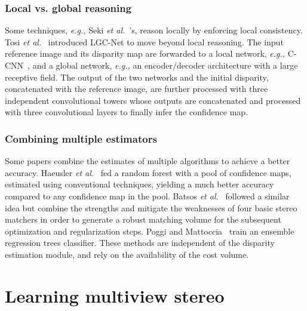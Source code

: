 \documentclass[10pt,journal,compsoc]{IEEEtran}
\newcommand{\eg}{\emph{e.g., }}
\newcommand{\etal}{\emph{et al.}}
\begin{document}
\subsubsection{Local vs. global reasoning}  Some techniques, \eg Seki \etal~\cite{seki2016patch}'s, reason locally by enforcing  local consistency. Tosi \etal~\cite{tosi2018beyond} introduced LGC-Net to move beyond local reasoning. The input reference image and its disparity map  are forwarded to a local network, \eg C-CNN~\cite{poggi2016learningfrom},  and a global  network, \eg an encoder/decoder architecture with  a large receptive field.  The output of the two networks and the initial disparity, concatenated with the reference image, are further processed with    three independent convolutional towers whose outputs are concatenated and processed with three  convolutional layers to finally infer the confidence map. 

\subsubsection{Combining multiple estimators}

Some papers  combine the estimates of multiple algorithms to achieve a better  accuracy. Haeusler \etal~\cite{haeusler2013ensemble} fed a random forest with a pool of    confidence maps, estimated using conventional techniques, yielding a much better accuracy compared  to any confidence map  in the pool.  Batsos \etal~\cite{batsos2018cbmv} followed a similar idea but combine the strengths and mitigate the weaknesses of four basic stereo matchers in order to generate a robust matching volume for the subsequent optimization and regularization steps.   Poggi and Mattoccia~\cite{poggi2016learning} train an ensemble regression trees classifier.  These methods are independent of the disparity estimation module,  and rely on the availability of the cost volume. 


\section{Learning multiview stereo}
\label{sec:mvs_architectures}
\end{document}
